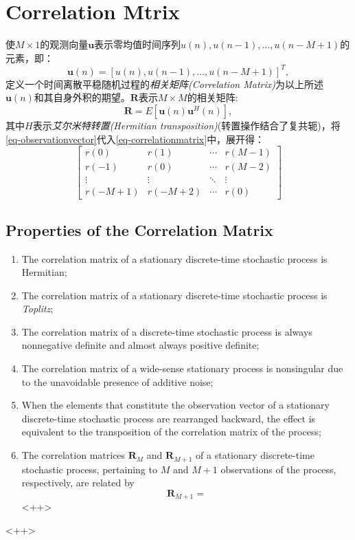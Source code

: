 \section{Correlation Mtrix}
使$M\times 1$的观测向量$\mathbf{u}$表示零均值时间序列$u(n),u(n-1),\dots,u(n-M+1)$的元素，即：
\begin{equation}
    \mathbf{u}(n) = \left[ u(n),u(n-1),\dots,u(n-M+1) \right]^T,
    \label{eq-observationvector}
\end{equation}
定义一个时间离散平稳随机过程的\emph{\textcolor[rgb]{1,0,0}{相关矩阵(Correlation Matrix)}}为以上所述$\mathbf{u}(n)$和其自身外积的期望。$\mathbf{R}$表示$M\times M$的相关矩阵:
\begin{equation}
    \mathbf{R} = E[\mathbf{u}(n)\mathbf{u}^H(n)],
    \label{eq-correlationmatrix}
\end{equation}
其中$H$表示\emph{\textcolor[rgb]{1,0,0}{艾尔米特转置(Hermitian transposition)}}(转置操作结合了复共轭)，将\cref{eq-observationvector}代入\cref{eq-correlationmatrix}中，展开得：
\begin{equation}
    \left[      
        \begin{array}{cccc}
        r(0) & r(1) & \cdots & r(M-1)\\
        r(-1) & r(0) & \cdots & r(M-2)\\
        \vdots & \vdots & \ddots & \vdots\\
        r(-M+1) & r(-M+2) & \cdots & r(0)
    \end{array}
    \right]
    \label{eq-correlationmatrixexpanded}
\end{equation}
\subsection{Properties of the Correlation Matrix}
\begin{enumerate}
    \item The correlation matrix of a stationary discrete-time stochastic process is Hermitian;
    \item The correlation matrix of a stationary discrete-time stochastic process is \emph{\textcolor[rgb]{1,0,0}{Toplitz}};
    \item The correlation matrix of a discrete-time stochastic process is always nonnegative definite and almost always positive definite;
    \item The correlation matrix of a wide-sense stationary process is nonsingular due to the unavoidable presence of additive noise;
    \item When the elements that constitute the observation vector of a stationary discrete-time stochastic process are rearranged backward, the effect is equivalent to the transposition of the correlation matrix of the process;
    \item The correlation matrices $\mathbf{R}_M$ and $\mathbf{R}_{M+1}$ of a stationary discrete-time stochastic process, pertaining to $M$ and $M+1$ observations of the process, respectively, are related by 
        \begin{equation*}
            \mathbf{R}_{M+1} = 
        \end{equation*}<++>
\end{enumerate}<++>

